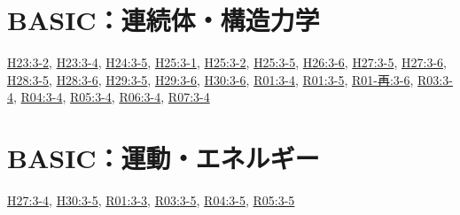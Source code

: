 \section{BASIC：連続体・構造力学}
\hyperref[q:h23-reg-basic-3-2]{H23:3-2}, \hyperref[q:h23-reg-basic-3-4]{H23:3-4}, \hyperref[q:h24-reg-basic-3-5]{H24:3-5}, \hyperref[q:h25-reg-basic-3-1]{H25:3-1}, \hyperref[q:h25-reg-basic-3-2]{H25:3-2}, \hyperref[q:h25-reg-basic-3-5]{H25:3-5}, \hyperref[q:h26-reg-basic-3-6]{H26:3-6}, \hyperref[q:h27-reg-basic-3-5]{H27:3-5}, \hyperref[q:h27-reg-basic-3-6]{H27:3-6}, \hyperref[q:h28-reg-basic-3-5]{H28:3-5}, \hyperref[q:h28-reg-basic-3-6]{H28:3-6}, \hyperref[q:h29-reg-basic-3-5]{H29:3-5}, \hyperref[q:h29-reg-basic-3-6]{H29:3-6}, \hyperref[q:h30-reg-basic-3-6]{H30:3-6}, \hyperref[q:r01-reg-basic-3-4]{R01:3-4}, \hyperref[q:r01-reg-basic-3-5]{R01:3-5}, \hyperref[q:r01-ret-basic-3-6]{R01-再:3-6}, \hyperref[q:r03-reg-basic-3-4]{R03:3-4}, \hyperref[q:r04-reg-basic-3-4]{R04:3-4}, \hyperref[q:r05-reg-basic-3-4]{R05:3-4}, \hyperref[q:r06-reg-basic-3-4]{R06:3-4}, \hyperref[q:r07-reg-basic-3-4]{R07:3-4}
\section{BASIC：運動・エネルギー}
\hyperref[q:h27-reg-basic-3-4]{H27:3-4}, \hyperref[q:h30-reg-basic-3-5]{H30:3-5}, \hyperref[q:r01-reg-basic-3-3]{R01:3-3}, \hyperref[q:r03-reg-basic-3-5]{R03:3-5}, \hyperref[q:r04-reg-basic-3-5]{R04:3-5}, \hyperref[q:r05-reg-basic-3-5]{R05:3-5}
